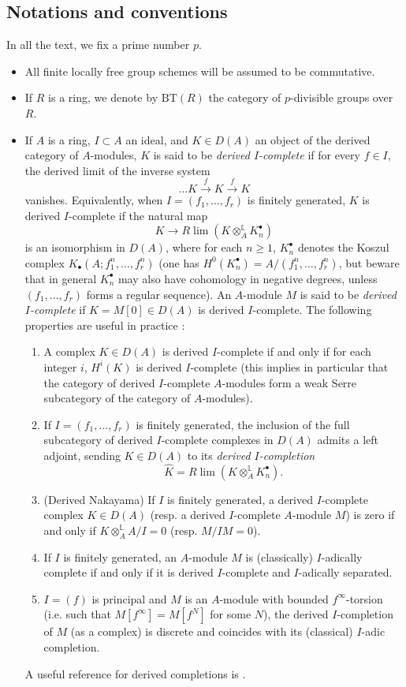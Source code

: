 \documentclass{amsart}
\theoremstyle{plain}
\theoremstyle{definition}
\newcommand{\BT}{\mathrm{BT}}
\begin{document}
\subsection{Notations and conventions}

In all the text, we fix a prime number $p$.

\begin{itemize}
\item All finite locally free group schemes will be assumed to be commutative.

\item If $R$ is a ring, we denote by $\BT(R)$ the category of $p$-divisible groups over $R$. 

\item If $A$ is a ring, $I \subset A$ an ideal, and $K \in D(A)$ an object of the derived category of $A$-modules, $K$ is said to be \textit{derived $I$-complete} if for every $f \in I$, the derived limit of the inverse system
\[ \dots K \overset{f} \to K \overset{f} \to K \]
vanishes. Equivalently, when $I=(f_1,\dots,f_r)$ is finitely generated, $K$ is derived $I$-complete if the natural map
\[ K \to R\lim(K \otimes_A^{\mathbb{L}} K_n^{\bullet}) \]
is an isomorphism in $D(A)$, where for each $n\geq 1$, $K_n^{\bullet}$ denotes the Koszul complex $K_{\bullet}(A;f_1^n,\dots,f_r^n)$ (one has $H^0(K_n^{\bullet})=A/(f_1^n,\dots,f_r^n)$, but beware that in general $K_n^{\bullet}$ may also have cohomology in negative degrees, unless $(f_1,\dots,f_r)$ forms a regular sequence). An $A$-module $M$ is said to be \textit{derived $I$-complete} if $K=M[0] \in D(A)$ is derived $I$-complete. The following properties are useful in practice :
\begin{enumerate}
\item A complex $K \in D(A)$ is derived $I$-complete if and only if for each integer $i$, $H^i(K)$ is derived $I$-complete (this implies in particular that the category of derived $I$-complete $A$-modules form a weak Serre subcategory of the category of $A$-modules).
\item If $I=(f_1,\dots,f_r)$ is finitely generated, the inclusion of the full subcategory of derived $I$-complete complexes in $D(A)$ admits a left adjoint, sending $K \in D(A)$ to its \textit{derived $I$-completion}
\[ \widehat{K} = R\lim(K \otimes_A^{\mathbb{L}} K_n^{\bullet}). \]
\item (Derived Nakayama) If $I$ is finitely generated, a derived $I$-complete complex $K \in D(A)$ (resp. a derived $I$-complete $A$-module $M$) is zero if and only if $K\otimes_A^{\mathbb{L}} A/I=0$ (resp. $M/IM=0$).
\item If $I$ is finitely generated, an $A$-module $M$ is (classically) $I$-adically complete if and only if it is derived $I$-complete and $I$-adically separated.
\item $I=(f)$ is principal and $M$ is an $A$-module with bounded $f^{\infty}$-torsion (i.e. such that $M[f^{\infty}]=M[f^N]$ for some $N$), the derived $I$-completion of $M$ (as a complex) is discrete and coincides with its (classical) $I$-adic completion.
\end{enumerate}
A useful reference for derived completions is \cite[Tag 091N]{stacks_project}. 


\end{itemize}
\end{document}

